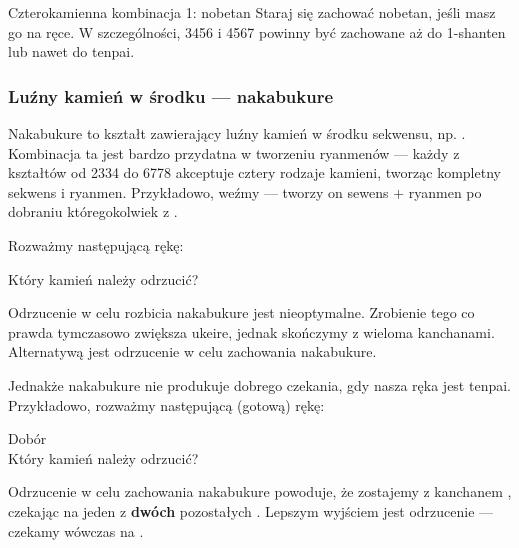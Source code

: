 \bigskip
\color{MyRed}
\begin{itembox}[c]{Czterokamienna kombinacja 1: {\jap nobetan}}
\normalcolor
Staraj się zachować {\jap nobetan}, jeśli masz go na ręce.
W szczególności, 3456 i 4567 powinny być zachowane aż do 1-{\jap shanten} lub nawet do {\jap tenpai}.
\end{itembox}
\normalcolor

\bigskip
\subsubsection{Luźny kamień w środku --- {\jap nakabukure}}

{\jap Nakabukure} to kształt zawierający luźny kamień w środku sekwensu, np. .
Kombinacja ta jest bardzo przydatna w tworzeniu {\jap ryanmen}ów --- każdy z kształtów od 2334 do 6778 akceptuje cztery rodzaje kamieni, tworząc kompletny sekwens i {\jap ryanmen}.
Przykładowo, weźmy  --- tworzy on sewens + {\jap ryanmen} po dobraniu któregokolwiek z .

Rozważmy następującą rękę:
\begin{screen}
	\vspace{-10pt}Który kamień należy odrzucić?\vspace{-5pt}
\end{screen}
Odrzucenie  w celu rozbicia {\jap nakabukure} jest nieoptymalne.
Zrobienie tego co prawda tymczasowo zwiększa {\jap ukeire}, jednak skończymy z wieloma {\jap kanchan}ami.
Alternatywą jest odrzucenie  w celu zachowania {\jap nakabukure}.

\bigskip
Jednakże {\jap nakabukure} nie produkuje dobrego czekania, gdy nasza ręka jest {\jap tenpai}.
Przykładowo, rozważmy następującą (gotową) rękę:
\begin{screen}
	\vspace{-15pt}\hfill{\footnotesize{Dobór~~~~~~~~~}}\\
	\vspace{-2pt}Który kamień należy odrzucić?\vspace{-5pt}
\end{screen}
Odrzucenie  w celu zachowania {\jap nakabukure}  powoduje, że zostajemy z {\jap kanchan}em , czekając na jeden z {\bf dwóch} pozostałych .
Lepszym wyjściem jest odrzucenie  --- czekamy wówczas na .

